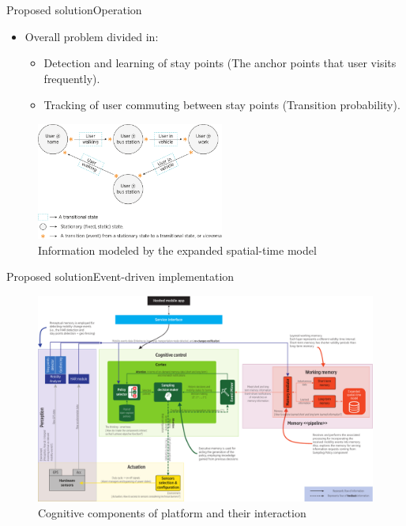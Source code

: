 \documentclass[9pt,xcolor={dvipsnames},handout]{beamer}
\begin{document}
\begin{frame}{Proposed solution}{Operation}
\begin{itemize}
  \item Overall problem divided in:
  \begin{itemize}
    \item Detection and learning of stay points (The anchor points that user visits frequently).
    \pause
    \item Tracking of user commuting between stay points (Transition probability).
  \end{itemize}
\end{itemize}
\pause
\begin{figure}
  \centering
  \includegraphics[width=0.55\textwidth]{vectors/zoom-expanded-spatial-time-model}
  \caption{Information modeled by the expanded spatial-time model}
  \label{fig:information-modeled-spatial-time-model}
\end{figure}
\end{frame}

\begin{frame}{Proposed solution}{Event-driven implementation}
\begin{figure}
  \centering
  \includegraphics[width=1\textwidth]{vectors/smartness-components-v4}
  \caption{Cognitive components of platform and their interaction}
  \label{fig:cognitive-components}
\end{figure}
\end{frame}
\end{document}
